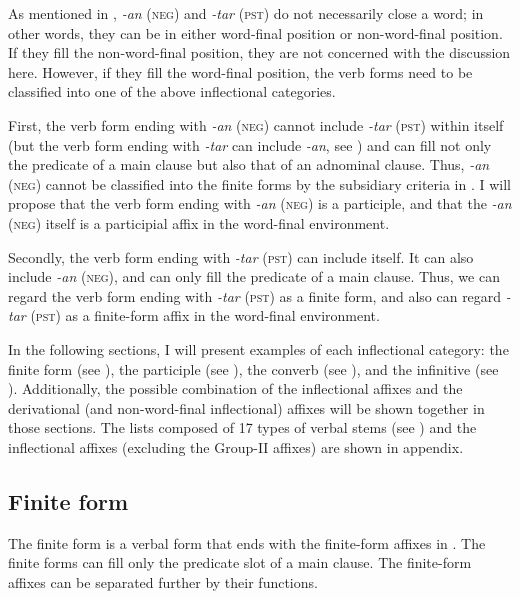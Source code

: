 As mentioned in , \textit{-an} (\textsc{neg}) and \textit{-tar} (\textsc{pst}) do not necessarily close a word; in other words, they can be in either word-final position or non-word-final position. If they fill the non-word-final position, they are not concerned with the discussion here. However, if they fill the word-final position, the verb forms need to be classified into one of the above inflectional categories.

First, the verb form ending with \textit{-an} (\textsc{neg}) cannot include \textit{-tar} (\textsc{pst}) within itself (but the verb form ending with \textit{-tar} can include \textit{-an}, see ) and can fill not only the predicate of a main clause but also that of an adnominal clause. Thus, \textit{-an} (\textsc{neg}) cannot be classified into the finite forms by the subsidiary criteria in . I will propose that the verb form ending with \textit{-an} (\textsc{neg}) is a participle, and that the \textit{-an} (\textsc{neg}) itself is a participial affix in the word-final environment.

Secondly, the verb form ending with \textit{-tar} (\textsc{pst}) can include itself. It can also include \textit{-an} (\textsc{neg}), and can only fill the predicate of a main clause. Thus, we can regard the verb form ending with \textit{-tar} (\textsc{pst}) as a finite form, and also can regard \textit{-tar} (\textsc{pst}) as a finite-form affix in the word-final environment.

In the following sections, I will present examples of each inflectional category: the finite form (see ), the participle (see ), the converb (see ), and the infinitive (see ). Additionally, the possible combination of the inflectional affixes and the derivational (and non-word-final inflectional) affixes will be shown together in those sections. The lists composed of 17 types of verbal stems (see ) and the inflectional affixes (excluding the Group-II affixes) are shown in appendix.

\subsection{Finite form}

The finite form is a verbal form that ends with the finite-form affixes in . The finite forms can fill only the predicate slot of a main clause. The finite-form affixes can be separated further by their functions.

